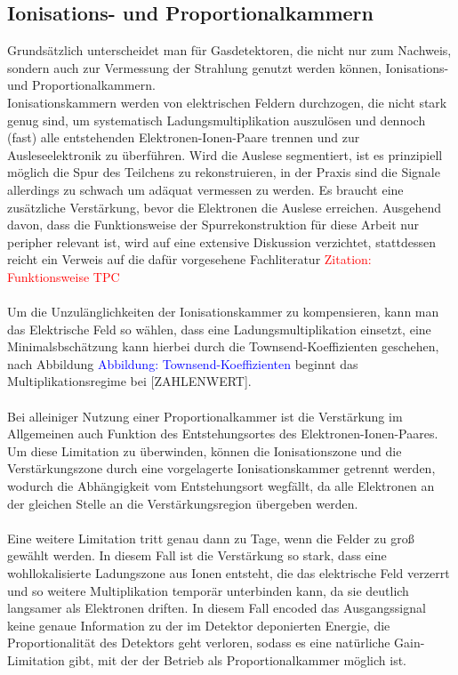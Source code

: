		\subsection{Ionisations- und Proportionalkammern} \label{sec:IonisationsundProportionalkammern}
			Grundsätzlich unterscheidet man für Gasdetektoren, die nicht nur zum Nachweis, sondern auch zur Vermessung der Strahlung genutzt werden können, Ionisations- und Proportionalkammern.\\
			 Ionisationskammern werden von elektrischen Feldern durchzogen, die nicht stark genug sind, um systematisch Ladungsmultiplikation auszulösen und dennoch (fast) alle entstehenden Elektronen-Ionen-Paare trennen und zur Ausleseelektronik zu überführen. Wird die Auslese segmentiert, ist es prinzipiell möglich die Spur des Teilchens zu rekonstruieren, in der Praxis sind die Signale allerdings zu schwach um adäquat vermessen zu werden. Es braucht eine zusätzliche Verstärkung, bevor die Elektronen die Auslese erreichen. Ausgehend davon, dass die Funktionsweise der Spurrekonstruktion für diese Arbeit nur peripher relevant ist, wird auf eine extensive Diskussion verzichtet, stattdessen reicht ein Verweis auf die dafür vorgesehene Fachliteratur \textcolor{red}{Zitation: Funktionsweise TPC}\\
			\\
			 Um die Unzulänglichkeiten der Ionisationskammer zu kompensieren, kann man das Elektrische Feld so wählen, dass eine Ladungsmultiplikation einsetzt, eine Minimalsbschätzung kann hierbei durch die Townsend-Koeffizienten geschehen, nach Abbildung \textcolor{blue}{Abbildung: Townsend-Koeffizienten} beginnt das Multiplikationsregime bei [ZAHLENWERT].\\
			 \\
			  Bei alleiniger Nutzung einer Proportionalkammer ist die Verstärkung im Allgemeinen auch Funktion des Entstehungsortes des Elektronen-Ionen-Paares. Um diese Limitation zu überwinden, können die Ionisationszone und die Verstärkungszone durch eine vorgelagerte Ionisationskammer getrennt werden, wodurch die Abhängigkeit vom Entstehungsort wegfällt, da alle Elektronen an der gleichen Stelle an die Verstärkungsregion übergeben werden.\\
			  \\
			  Eine weitere Limitation tritt genau dann zu Tage, wenn die Felder zu groß gewählt werden. In diesem Fall ist die Verstärkung so stark, dass eine wohllokalisierte Ladungszone aus Ionen entsteht, die das elektrische Feld verzerrt und so weitere Multiplikation temporär unterbinden kann, da sie deutlich langsamer als Elektronen driften. In diesem Fall encoded das Ausgangssignal keine genaue Information zu der im Detektor deponierten Energie, die Proportionalität des Detektors geht verloren, sodass es eine natürliche Gain-Limitation gibt, mit der der Betrieb als Proportionalkammer möglich ist.
			 
